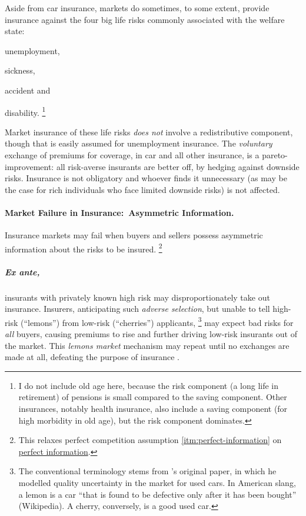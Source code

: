 Aside from car insurance, markets do sometimes, to some extent, provide insurance against the four big life risks commonly associated with the welfare state:
\begin{inparaenum}
	\item unemployment,
	\item sickness,
	\item accident and
	\item disability.
	\footnote{
		I do not include old age here, because the risk component (a long life in retirement) of pensions is small compared to the saving component.
		Other insurances, notably health insurance, also include a saving component (for high morbidity in old age), but the risk component dominates.
	}
\end{inparaenum}

Market insurance of these life risks \emph{does not} involve a redistributive component, though that is easily assumed for unemployment insurance.
The \emph{voluntary} exchange of premiums for coverage, in car and all other insurance, is a pareto-improvement:
all risk-averse insurants are better off, by hedging against downside risks.
Insurance is not obligatory and whoever finds it unnecessary (as may be the case for rich individuals who face limited downside risks) is not affected.

\paragraph{Market Failure in Insurance:\ Asymmetric Information.}
	\label{sec:asymmetric-information}

Insurance markets may fail when buyers and sellers possess asymmetric information about the risks to be insured.
\footnote{
	This relaxes perfect competition assumption \ref{itm:perfect-information} on \hyperref[itm:perfect-information]{perfect information}.
}

\subparagraph[Adverse Selection]{Ex ante,}
	\label{sec:adverse-selection}
insurants with privately known high risk may disproportionately take out insurance.
Insurers, anticipating such \emph{adverse selection}, but unable to tell high-risk (``lemons'') from low-risk (``cherries'') applicants,
\footnote{
	The conventional terminology stems from \citeauthor{Akerlof-1970-aa}'s original paper, in which he modelled quality uncertainty in the market for used cars.
	In American slang, a lemon is a car ``that is found to be defective only after it has been bought'' (Wikipedia).
	A cherry, conversely, is a good used car.
}
may expect bad risks for \emph{all} buyers, causing premiums to rise and further driving low-risk insurants out of the market.
This \emph{lemons market} mechanism may repeat until no exchanges are made at all, defeating the purpose of insurance \citep{Akerlof-1970-aa}.

